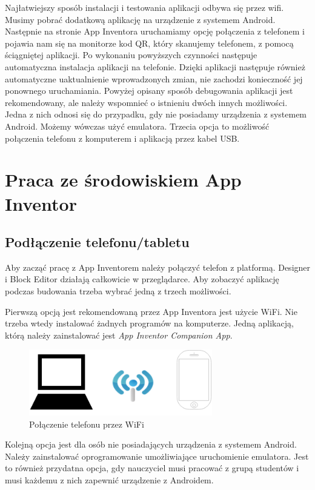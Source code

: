 Najłatwiejszy sposób instalacji i testowania aplikacji odbywa się przez wifi. Musimy pobrać dodatkową aplikację na urządzenie z systemem Android. Następnie na stronie App Inventora uruchamiamy opcję połączenia z telefonem i pojawia nam się na monitorze kod QR, który skanujemy telefonem, z pomocą ściągniętej aplikacji. Po wykonaniu powyższych czynności następuje automatyczna instalacja aplikacji na telefonie. Dzięki aplikacji następuje również automatyczne uaktualnienie wprowadzonych zmian, nie zachodzi konieczność jej ponownego uruchamiania. 
Powyżej opisany sposób debugowania aplikacji jest rekomendowany, ale należy wspomnieć o istnieniu dwóch innych możliwości. Jedna z nich odnosi się do przypadku, gdy nie posiadamy urządzenia z systemem Android. Możemy wówczas użyć emulatora. Trzecia opcja to możliwość połączenia telefonu z komputerem i aplikacją przez kabel USB. 

\section{Praca ze środowiskiem App Inventor}

\subsection{Podłączenie telefonu/tabletu}

Aby zacząć pracę z App Inventorem należy połączyć telefon z platformą. Designer i Block Editor działają całkowicie w przeglądarce. Aby zobaczyć aplikację podczas budowania trzeba wybrać jedną z trzech możliwości.\cite{android:40}

Pierwszą opcją jest rekomendowaną przez App Inventora jest użycie WiFi. Nie trzeba wtedy instalować żadnych programów na komputerze. Jedną aplikacją, którą należy zainstalować jest \emph{App Inventor Companion App}.

\begin{figure}[H] 
\centering\includegraphics[width=8cm]{figures/option1wifi}
\caption{Połączenie telefonu przez WiFi}
\end{figure}

Kolejną opcja jest dla osób nie posiadających urządzenia z systemem Android. Należy zainstalować oprogramowanie umożliwiające uruchomienie emulatora. Jest to również przydatna opcja, gdy nauczyciel musi pracować z grupą studentów i musi każdemu z nich zapewnić urządzenie z Androidem.\cite{android:40}

